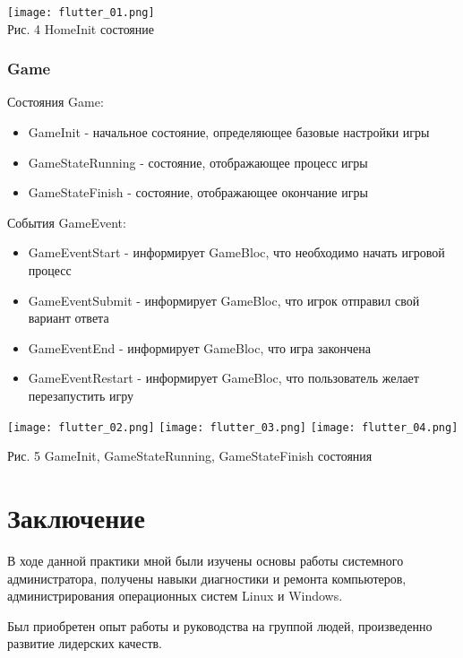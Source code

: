\documentclass[14pt, oneside]{altsu-report}
\begin{document}
\begin{center}
  \texttt{[image: flutter\_01.png]}\\

  Рис. 4 HomeInit состояние
\end{center}

\subsection*{Game}
Состояния Game:
\begin{itemize}
  \item GameInit - начальное состояние, определяющее базовые настройки игры
  \item GameStateRunning - состояние, отображающее процесс игры
  \item GameStateFinish - состояние, отображающее окончание игры
\end{itemize}

События GameEvent:
\begin{itemize}
  \item GameEventStart - информирует GameBloc, что необходимо начать игровой процесс
  \item GameEventSubmit - информирует GameBloc, что игрок отправил свой вариант ответа
  \item GameEventEnd - информирует GameBloc, что игра закончена
  \item GameEventRestart - информирует GameBloc, что пользователь желает перезапустить игру
\end{itemize}


\begin{center}
  \texttt{[image: flutter\_02.png]}
  \texttt{[image: flutter\_03.png]}
  \texttt{[image: flutter\_04.png]}

  Рис. 5 GameInit, GameStateRunning, GameStateFinish состояния
\end{center}




\chapter*{Заключение}
В ходе данной практики мной были изучены основы работы системного администратора, получены навыки диагностики и ремонта компьютеров, администрирования операционных систем Linux и Windows. 

Был приобретен опыт работы и руководства на группой людей, произведенно развитие лидерских качеств.
\end{document}
